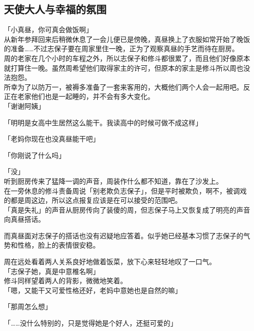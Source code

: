 \subsection{天使大人与幸福的氛围}

「小真昼，你可真会做饭啊」\\

从新年参拜回来后稍微休息了一会儿便已是傍晚，真昼换上了衣服如常开始了晚饭的准备……不过志保子要在周家里住一晚，正为了观察真昼的手艺而待在厨房。\\

周的老家在几个小时的车程之外，所以志保子和修斗都很累了，而且他们好像原本就打算住一晚。虽然周希望他们取得家主的许可，但原本的家主是修斗所以周也没法抱怨。\\

所幸为了以防万一，被褥多准备了一套来客用的，大概他们两个人会一起用吧。反正在老家他们也是一起睡的，并不会有多大变化。\\

「谢谢阿姨」

「明明是女高中生居然这么能干。我读高中的时候可做不成这样」

「老妈你现在也没真昼能干吧」

「你刚说了什么吗」

「没」\\

听到厨房传来了猛降一调的声音，周装作什么都不知道，靠在了沙发上。\\

在一旁休息的修斗责备周说「别老欺负志保子」，但是平时被欺负，啊不，被调戏的都是周这边，所以这点报复应该是在可以接受的范围吧。\\

「真是失礼」的声音从厨房传向了装傻的周，但志保子马上又恢复成了明亮的声音向真昼搭话。

而真昼面对志保子的搭话也没有迟疑地应答着。似乎她已经基本习惯了志保子的气势和性格，脸上的表情很安稳。

周在远处看着两人关系良好地做着饭菜，放下心来轻轻地叹了一口气。\\

「志保子她，真是中意椎名啊」\\

修斗同样望着两人的背影，微微地笑着。\\

「嗯，又能干又可爱性格还好，老妈中意她也是自然的嘛」

「那周怎么想」

「……没什么特别的，只是觉得她是个好人，还挺可爱的」

